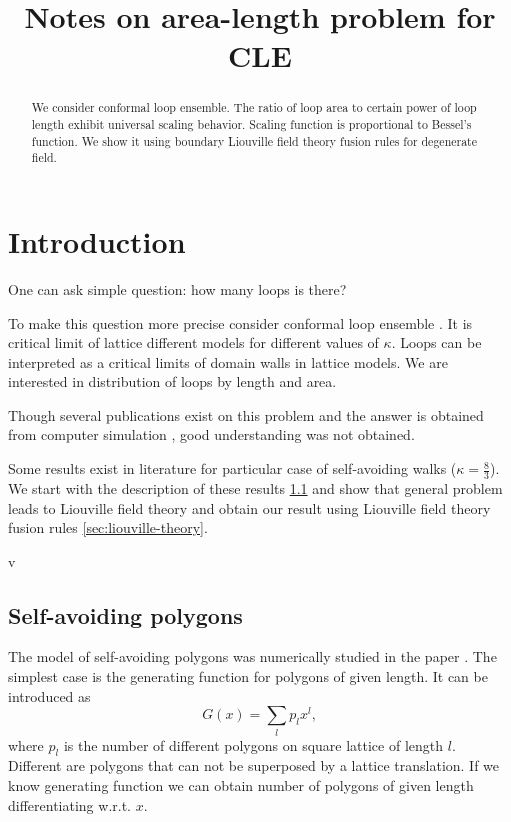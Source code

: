 \documentclass[12pt]{article}
\begin{document}
\title{Notes on area-length problem for CLE}

\maketitle

\begin{abstract}

  We consider conformal loop ensemble. The ratio
  of loop area to certain power of loop length exhibit universal
  scaling behavior. Scaling function is proportional to Bessel's
  function. We show it using boundary Liouville field theory fusion rules for degenerate field.
\end{abstract}

\section{Introduction}
\label{sec:introduction}


One can ask simple question: how many loops is there?

To make this question more precise consider conformal loop ensemble \cite{sheffield2010conformal}. It is critical limit of
lattice different models for different values of $\kappa$. Loops can be interpreted as a critical
limits of domain walls in lattice models. 
We are interested in distribution of loops by length and area. 

Though several publications exist
\cite{cardy2003exact,cardy2003crossover,cardy2001exact,cardy1994geometrical}
on this problem and the answer is
obtained from computer simulation \cite{ richard2001scaling}, good understanding was not
obtained. 


Some results exist in literature for particular case of self-avoiding walks ($\kappa=\frac{8}{3}$). We start
with the description of these results \ref{sec:self-avoid-polyg} and show that general problem
leads to Liouville field theory and obtain our result using Liouville
field theory fusion rules \ref{sec:liouville-theory}. 




v\subsection{Self-avoiding polygons}
\label{sec:self-avoid-polyg}

The model of self-avoiding polygons was numerically studied in the paper \cite{richard2001scaling}.
The simplest case is the generating function for polygons of given length. It can be introduced as
\begin{equation}
  \label{eq:86}
  G(x)=\sum_l p_l x^l,
\end{equation}
where  $p_l$ is the number of different polygons on square lattice of length $l$. Different are
polygons that can not be superposed by a lattice translation.
If we know generating function we can obtain number of polygons of given length differentiating
w.r.t. $x$. 
\end{document}
